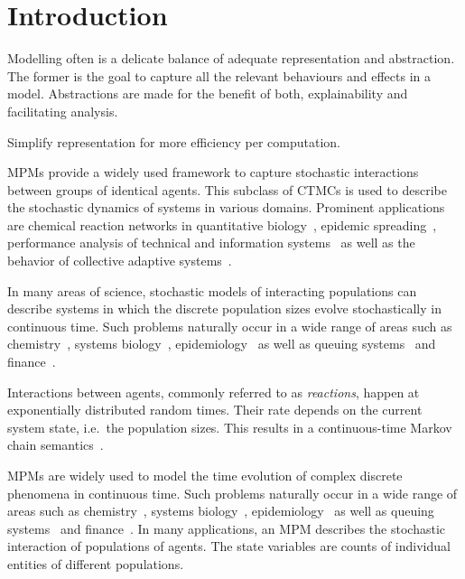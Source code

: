 \chapter{Introduction}
Modelling often is a delicate balance of adequate representation and abstraction.
The former is the goal to capture all the relevant behaviours and effects in a model.
Abstractions are made for the benefit of both, explainability and facilitating analysis.

Simplify representation for more efficiency per computation.



\Acfp{MPM} provide a
widely used framework to capture stochastic interactions between groups of identical agents.
This subclass of \acfp{CTMC}  is used
to describe the stochastic dynamics of systems in various domains.
Prominent applications are chemical reaction networks in quantitative
biology~\cite{BuchWolkenhauer},
epidemic spreading~\cite{porter2016dynamical}, performance analysis  of technical and
information systems~\cite{bortolussi2013,gast2019} as well as the behavior of
collective adaptive systems~\cite{bernardo2016}.








In many areas of science, stochastic models  of interacting populations can describe systems in which the discrete population sizes evolve stochastically in continuous time.
Such problems naturally occur in a wide range of areas such as chemistry~\cite{gillespie1977exact}, systems biology~\cite{wilkinson2018stochastic,ullah2011stochastic}, epidemiology~\cite{mode2000stochastic} as well as    queuing systems~\cite{breuer2003markov} and finance~\cite{pardoux2008markov}.

Interactions between agents, commonly referred to as \emph{reactions}, happen at exponentially distributed random times. 
Their rate depends on the current system state, i.e.\ the population sizes.
This results in a continuous-time Markov chain semantics~\cite{anderson2012continuous}.






\Acp{MPM} are widely used to model the time evolution of complex  discrete phenomena in continuous time.
Such problems naturally occur in a wide range of areas such as chemistry~\cite{gillespie1977exact}, systems biology~\cite{wilkinson2018stochastic,ullah2011stochastic}, epidemiology~\cite{mode2000stochastic} as well as    queuing systems~\cite{breuer2003markov} and finance~\cite{pardoux2008markov}.
In many applications, an MPM describes the stochastic interaction of populations of agents.
The state variables are counts of individual entities of different populations.



